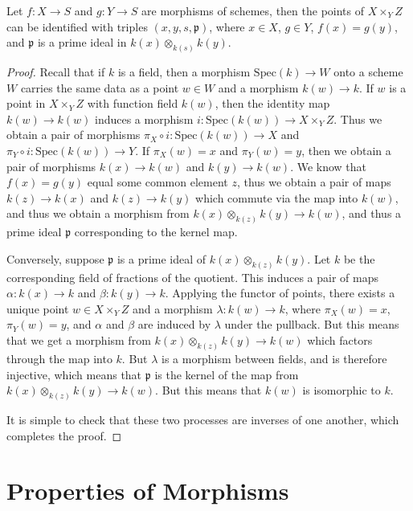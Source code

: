 \begin{theorem}
    Let $f: X \to S$ and $g: Y \to S$ are morphisms of schemes, then the points of $X \times_Y Z$ can be identified with triples $(x,y,s,\mathfrak{p})$, where $x \in X$, $g \in Y$, $f(x) = g(y)$, and $\mathfrak{p}$ is a prime ideal in $k(x) \otimes_{k(s)} k(y)$.
\end{theorem}
\begin{proof}
    Recall that if $k$ is a field, then a morphism $\text{Spec}(k) \to W$ onto a scheme $W$ carries the same data as a point $w \in W$ and a morphism $k(w) \to k$. If $w$ is a point in $X \times_Y Z$ with function field $k(w)$, then the identity map $k(w) \to k(w)$ induces a morphism $i: \text{Spec}(k(w)) \to X \times_Y Z$. Thus we obtain a pair of morphisms $\pi_X \circ i: \text{Spec}(k(w)) \to X$ and $\pi_Y \circ i: \text{Spec}(k(w)) \to Y$. If $\pi_X(w) = x$ and $\pi_Y(w) = y$, then we obtain a pair of morphisms $k(x) \to k(w)$ and $k(y) \to k(w)$. We know that $f(x) = g(y)$ equal some common element $z$, thus we obtain a pair of maps $k(z) \to k(x)$ and $k(z) \to k(y)$ which commute via the map into $k(w)$, and thus we obtain a morphism from $k(x) \otimes_{k(z)} k(y) \to k(w)$, and thus a prime ideal $\mathfrak{p}$ corresponding to the kernel map.

    Conversely, suppose $\mathfrak{p}$ is a prime ideal of $k(x) \otimes_{k(z)} k(y)$. Let $k$ be the corresponding field of fractions of the quotient. This induces a pair of maps $\alpha: k(x) \to k$ and $\beta: k(y) \to k$. Applying the functor of points, there exists a unique point $w \in X \times_Y Z$ and a morphism $\lambda: k(w) \to k$, where $\pi_X(w) = x$, $\pi_Y(w) = y$, and $\alpha$ and $\beta$ are induced by $\lambda$ under the pullback. But this means that we get a morphism from $k(x) \otimes_{k(z)} k(y) \to k(w)$ which factors through the map into $k$. But $\lambda$ is a morphism between fields, and is therefore injective, which means that $\mathfrak{p}$ is the kernel of the map from $k(x) \otimes_{k(z)} k(y) \to k(w)$. But this means that $k(w)$ is isomorphic to $k$.

    It is simple to check that these two processes are inverses of one another, which completes the proof.
\end{proof}












\section{Properties of Morphisms}

